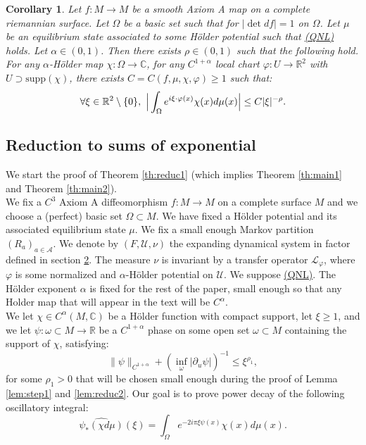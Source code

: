 \documentclass[a4paper]{article}
\newtheorem{corollary}[theorem]{Corollary}
\theoremstyle{definition}
\begin{document}
\begin{corollary}\label{co:reduc2}
Let $f:M \rightarrow M$ be a smooth Axiom A map on a complete riemannian surface. Let $\Omega$ be a basic set such that for $|\det df| = 1$ on $\Omega$. Let $\mu$ be an equilibrium state associated to some Hölder potential such that \hyperref[QNL]{(QNL)} holds. Let $\alpha \in (0,1)$.  Then there exists $\rho \in (0,1)$ such that the following hold. \\

For any $\alpha$-Hölder map $\chi : \Omega 
\rightarrow \mathbb{C}$, for any $C^{1+\alpha}$ local chart $\varphi: U \rightarrow \mathbb{R}^2$ with $U \supset \text{supp}(\chi)$, there exists $C=C({f,\mu,\chi,\varphi}) \geq 1$ such that:
$$\forall \xi \in \mathbb{R}^2 \setminus \{0\}, \ \Big{|} \int_\Omega e^{i \xi \cdot \varphi(x) } \chi(x) d\mu(x) \Big{|} \leq C |\xi|^{-\rho} .$$
\end{corollary}




\subsection{Reduction to sums of exponential}

We start the proof of Theorem \ref{th:reduc1} (which implies Theorem \ref{th:main1} and Theorem \ref{th:main2}). \\

We fix a $C^{3}$ Axiom A diffeomorphism $f:M \rightarrow M$ on a complete surface $M$ and we choose a (perfect) basic set $\Omega \subset M$. We have fixed a Hölder potential and its associated equilibrium state $\mu$. We fix a small enough Markov partition $(R_a)_{a \in \mathcal{A}}$. We denote by $(F,\mathcal{U},\nu)$ the expanding dynamical system in factor defined in section \hyperref[sec:preli]{2}. The measure $\nu$ is invariant by a transfer operator $\mathcal{L}_\varphi$, where $\varphi$ is some normalized and $\alpha$-Hölder potential on $\mathcal{U}$. We suppose \hyperref[QNL]{(QNL)}. The Hölder exponent $\alpha$ is fixed for the rest of the paper, small enough so that any Holder map that will appear in the text will be $C^\alpha$. \\

We let $\chi \in C^\alpha(M,\mathbb{C})$ be a Hölder function with compact support, let $\xi \geq 1$, and we let $\psi: \omega \subset M \rightarrow \mathbb{R}$ be a $C^{1+\alpha}$ phase on some open set $\omega \subset M$ containing the support of $\chi$, satisfying:
$$ \|\psi\|_{C^{1+\alpha}} + (\inf_{\omega} |\partial_u \psi|)^{-1} \leq \xi^{\rho_1} ,$$
for some $\rho_1>0$ that will be chosen small enough during the proof of Lemma \ref{lem:step1} and \ref{lem:reduc2}. Our goal is to prove power decay of the following oscillatory integral:
$$ \widehat{\psi_*(\chi d\mu)}(\xi) = \int_{\Omega} e^{- 2 i \pi \xi \psi(x)} \chi(x) d\mu(x) .$$
\end{document}
